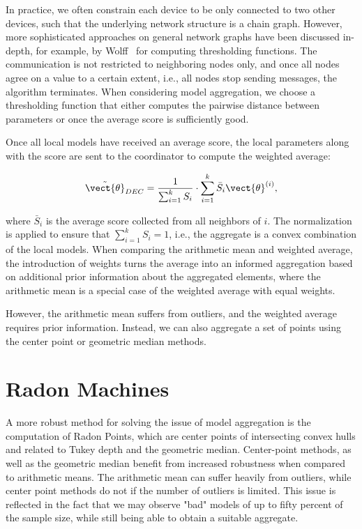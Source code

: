 

In practice, we often constrain each device to be only connected to two other devices, such that the underlying network structure is a chain graph.
However, more sophisticated approaches on general network graphs have been discussed in-depth, for example, by Wolff~\cite{wolff2013local} for computing thresholding functions.
The communication is not restricted to neighboring nodes only, and once all nodes agree on a value to a certain extent, i.e., all nodes stop sending messages, the algorithm terminates.
When considering model aggregation, we choose a thresholding function that either computes the pairwise distance between parameters or once the average score is sufficiently good.

Once all local models have received an average score, the local parameters along with the score are sent to the coordinator to compute the weighted average:

\begin{equation}
    \label{eq:scorenorm}
    \tilde{\vect{\theta}}_{DEC} = \frac{1}{\sum_{i=1}^k S_i} \cdot \sum_{i=1}^k \bar{S}_i \vect{\theta}^{(i)},
\end{equation}

where $\bar{S}_i$ is the average score collected from all neighbors of $i$. 
The normalization is applied to ensure that $\sum_{i=1}^k S_i = 1$, i.e., the aggregate is a convex combination of the local models.
When comparing the arithmetic mean and weighted average, the introduction of weights turns the average into an informed aggregation based on additional prior information about the aggregated elements, where the arithmetic mean is a special case of the weighted average with equal weights.

However, the arithmetic mean suffers from outliers, and the weighted average requires prior information.
Instead, we can also aggregate a set of points using the center point or geometric median methods.

\section{Radon Machines}
\label{ssec:radon}
A more robust method for solving the issue of model aggregation is the computation of Radon Points, which are center points of intersecting convex hulls and related to Tukey depth and the geometric median. 
Center-point methods, as well as the geometric median benefit from increased robustness when compared to arithmetic means.
The arithmetic mean can suffer heavily from outliers, while center point methods do not if the number of outliers is limited.
This issue is reflected in the fact that we may observe "bad" models of up to fifty percent of the sample size, while still being able to obtain a suitable aggregate.

